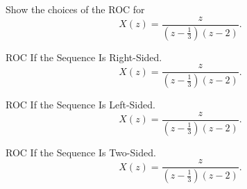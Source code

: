 \begin{frame}
    \begin{example}
        Show the choices of the ROC for
        \begin{equation*}
            X(z) = \frac{z}{\left(z - \frac{1}{3}\right)\left(z-2\right)}.
        \end{equation*}
    \end{example}
\end{frame}

\begin{frame}{ROC If the Sequence Is Right-Sided.}
    \begin{equation*}
        X(z) = \frac{z}{\left(z - \frac{1}{3}\right)\left(z-2\right)}.
    \end{equation*}
    {
        \begin{solution}
        \begin{center}
            
        \end{center}
        \end{solution}
    }
\end{frame}

\begin{frame}{ROC If the Sequence Is Left-Sided.}
    \begin{equation*}
        X(z) = \frac{z}{\left(z - \frac{1}{3}\right)\left(z-2\right)}.
    \end{equation*}
    {
        \begin{solution}
        \begin{center}
            
        \end{center}
        \end{solution}
    }
\end{frame}

\begin{frame}{ROC If the Sequence Is Two-Sided.}
    \begin{equation*}
        X(z) = \frac{z}{\left(z - \frac{1}{3}\right)\left(z-2\right)}.
    \end{equation*}
    {
        \begin{solution}
        \begin{center}
            
        \end{center}
        \end{solution}
    }
\end{frame}

